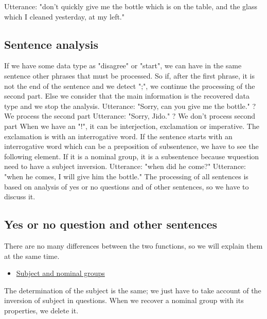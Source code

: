 \documentclass[twoside,a4paper,10pt]{report}
\begin{document}
\small
\begin{verbatimtab}
  Utterance: "don't quickly give me the bottle which is on the table, and the glass which I cleaned
yesterday, at my left."
\end{verbatimtab}
\normalsize

\subsection{Sentence analysis}
\label{32c0b571d3057222f6d267b69785af3c}%
If we have some data type as "disagree" or "start", we can have in the same sentence other phrases that must be processed. So if, after the first phrase, it is not the end of the sentence and we detect ";", we continue the processing of the second part. Else we consider that the main information is the recovered data type and we stop the analysis.
Utterance: "Sorry, can you give me the bottle." ? We process the second part
Utterance: "Sorry, Jido." ? We don't process second part
When we have an "!", it can be interjection, exclamation or imperative. The exclamation is with an interrogative word.
If the sentence starts with an interrogative word which can be a preposition of subsentence, we have to see the following element. If it is a nominal group, it is a subsentence because w{\textunderscore}question need to have a subject inversion.
Utterance: "when did he come?"
Utterance: "when he comes, I will give him the bottle."
The processing of all sentences is based on analysis of yes or no questions and of other sentences, so we have to discuss it.


\subsection{Yes or no question and other sentences}
\label{b250d357238309c118ecc37bb80c574b}%
There are no many differences between the two functions, so we will explain them at the same time.



\begin{itemize}
    \item  \underline{Subject and nominal groups}
\end{itemize}
The determination of the subject is the same; we just have to take account of the inversion of subject in questions.
When we recover a nominal group with its properties, we delete it.
\end{document}

